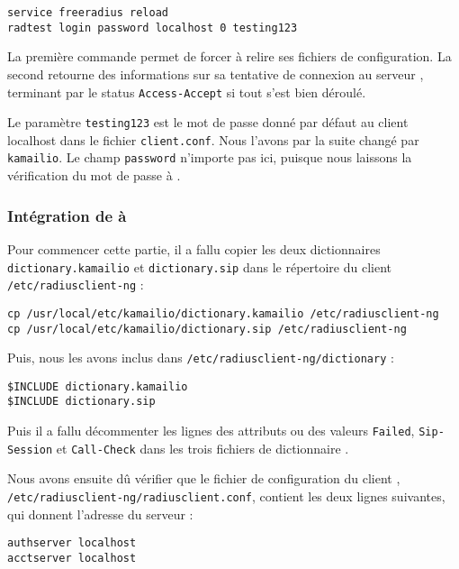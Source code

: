 \begin{verbatim}
service freeradius reload
radtest login password localhost 0 testing123
\end{verbatim}

La première commande permet de forcer {\frad} à relire ses fichiers de configuration. La second retourne des informations sur sa tentative de connexion au serveur {\frad}, terminant par le status \texttt{Access-Accept} si tout s’est bien déroulé.

Le paramètre \texttt{testing123} est le mot de passe donné par défaut au client localhost dans le fichier \texttt{client.conf}. Nous l'avons par la suite changé par \texttt{kamailio}. Le champ \texttt{password} n’importe pas ici, puisque nous laissons la vérification du mot de passe à {\kam}.

\subsubsection{Intégration de {\rad} à {\kam}}

Pour commencer cette partie, il a fallu copier les deux  dictionnaires {\rad} \texttt{dictionary.kamailio} et \texttt{dictionary.sip} dans le répertoire du client {\rad} \texttt{/etc/radiusclient-ng} :

\begin{small}
\begin{verbatim}
cp /usr/local/etc/kamailio/dictionary.kamailio /etc/radiusclient-ng
cp /usr/local/etc/kamailio/dictionary.sip /etc/radiusclient-ng
\end{verbatim}
\end{small}

Puis, nous les avons inclus dans \texttt{/etc/radiusclient-ng/dictionary} :

\begin{verbatim}
$INCLUDE dictionary.kamailio
$INCLUDE dictionary.sip
\end{verbatim}

Puis il a fallu décommenter les lignes des attributs ou des valeurs \texttt{Failed}, \texttt{Sip-Session} et \texttt{Call-Check} dans les trois fichiers de dictionnaire {\rad}.

Nous avons ensuite dû vérifier que le fichier de configuration du client {\rad}, \texttt{/etc/radiusclient-ng/radiusclient.conf}, contient les deux lignes suivantes, qui donnent l'adresse du serveur {\rad} :

\begin{verbatim}
authserver localhost
acctserver localhost
\end{verbatim}

